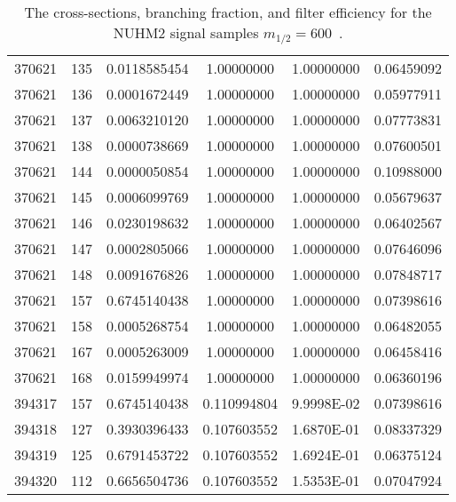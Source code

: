\begin{table}[htp]
{{\begin{tabular}{cccccc}
370621 & 135         & 0.0118585454         & 1.00000000  & 1.00000000        & 0.06459092\\
370621 & 136         & 0.0001672449         & 1.00000000  & 1.00000000        & 0.05977911\\
370621 & 137         & 0.0063210120         & 1.00000000  & 1.00000000        & 0.07773831\\
370621 & 138         & 0.0000738669         & 1.00000000  & 1.00000000        & 0.07600501\\
370621 & 144         & 0.0000050854         & 1.00000000  & 1.00000000        & 0.10988000\\
370621 & 145         & 0.0006099769         & 1.00000000  & 1.00000000        & 0.05679637\\
370621 & 146         & 0.0230198632         & 1.00000000  & 1.00000000        & 0.06402567\\
370621 & 147         & 0.0002805066         & 1.00000000  & 1.00000000        & 0.07646096\\
370621 & 148         & 0.0091676826         & 1.00000000  & 1.00000000        & 0.07848717\\
370621 & 157         & 0.6745140438         & 1.00000000  & 1.00000000        & 0.07398616\\
370621 & 158         & 0.0005268754         & 1.00000000  & 1.00000000        & 0.06482055\\
370621 & 167         & 0.0005263009         & 1.00000000  & 1.00000000        & 0.06458416\\
370621 & 168         & 0.0159949974         & 1.00000000  & 1.00000000        & 0.06360196\\
394317 & 157         & 0.6745140438         & 0.110994804 & 9.9998E-02        & 0.07398616\\
394318 & 127         & 0.3930396433         & 0.107603552 & 1.6870E-01        & 0.08337329\\
394319 & 125         & 0.6791453722         & 0.107603552 & 1.6924E-01        & 0.06375124\\
394320 & 112         & 0.6656504736         & 0.107603552 & 1.5353E-01        & 0.07047924\\
\hline
\hline
\end{tabular}
}
}
\caption{The cross-sections, branching fraction, and filter efficiency for the NUHM2 signal samples $m_{1/2} = 600$~{\GeV}.}
\label{tab:app_xsec_m12_600}
\end{table}%

